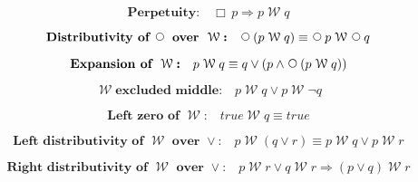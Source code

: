 \documentclass[12pt, fleqn, leqno]{article}
\newcommand{\impl}{\ensuremath{\Rightarrow}}        %
\newcommand{\Wait}{\;\mathcal{W}\;}
\newcommand{\Next}{\;\,\text{\raisebox{3.5pt}{\circle{6}}}}
\newcommand{\Always}{\Box\,}
\newcommand{\spacer}{\vspace{-30pt}}
\begin{document}
\begin{equation}\label{E:alwaysImpWait}
\textbf{Perpetuity:}\quad \Always p \impl p \Wait q
\end{equation}

\spacer

\begin{equation}\label{E:waitNextDist}
\textbf{Distributivity of $\Next$ over $\Wait$:}\quad \Next (p \Wait q) \equiv \Next p \Wait \Next q
\end{equation}

\spacer

\begin{equation}\label{E:expansionWait}
\textbf{Expansion of $\Wait$:}\quad p \Wait q \equiv q \lor (p \land \Next (p \Wait q))
\end{equation}

\spacer

\begin{equation}\label{E:waitExcludedMiddle}
\Wait \textbf{excluded middle:}\quad p \Wait q \lor p\Wait \neg q
\end{equation}

\spacer

\begin{equation}\label{E:leftZeroWait}
\textbf{Left zero of $\Wait$:}\quad true \Wait q \equiv true
\end{equation}

\spacer

\begin{equation}\label{E:waitOrDist}
\textbf{Left distributivity of $\Wait$ over $\lor$:}\quad p \Wait (q \lor r) \equiv p \Wait q \lor p \Wait r
\end{equation}

\spacer

\begin{equation}\label{E:rightWaitOrDist}
\textbf{Right distributivity of $\Wait$ over $\lor$:}\quad p \Wait r \lor q \Wait r \impl (p \lor q) \Wait r
\end{equation}

\spacer
\end{document}
